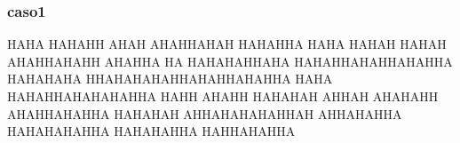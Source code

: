 \subsubsection{caso1}
HAHA HAHAHH AHAH AHAHHAHAH HAHAHHA HAHA HAHAH HAHAH AHAHHAHAHH AHAHHA HA HAHAHAHHAHA  HAHAHHAHAHHAHAHHA HAHAHAHA HHAHAHAHAHHAHAHHAHAHHA HAHA HAHAHHAHAHAHAHHA HAHH AHAHH HAHAHAH AHHAH AHAHAHH AHAHHAHAHHA HAHAHAH AHHAHAHAHAHHAH AHHAHAHHA HAHAHAHAHHA HAHAHAHHA HAHHAHAHHA